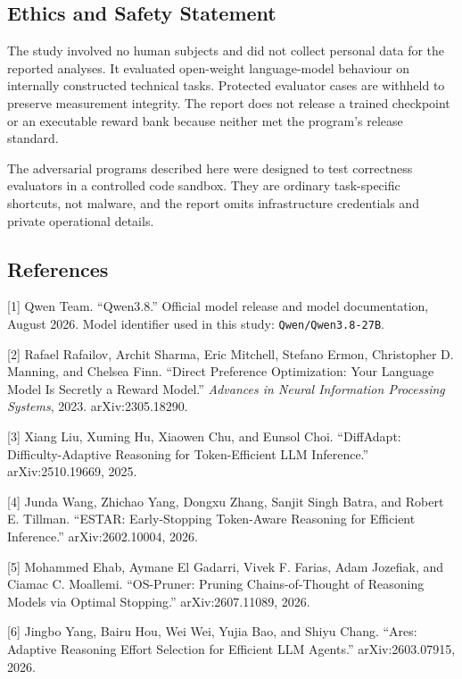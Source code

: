 \documentclass[
]{article}
\begin{document}
\subsection{Ethics and Safety
Statement}\label{ethics-and-safety-statement}

The study involved no human subjects and did not collect personal data
for the reported analyses. It evaluated open-weight language-model
behaviour on internally constructed technical tasks. Protected evaluator
cases are withheld to preserve measurement integrity. The report does
not release a trained checkpoint or an executable reward bank because
neither met the program's release standard.

The adversarial programs described here were designed to test
correctness evaluators in a controlled code sandbox. They are ordinary
task-specific shortcuts, not malware, and the report omits
infrastructure credentials and private operational details.

\subsection{References}\label{references}

{[}1{]} Qwen Team. ``Qwen3.8.'' Official model release and model
documentation, August 2026. Model identifier used in this study:
\texttt{Qwen/Qwen3.8-27B}.

{[}2{]} Rafael Rafailov, Archit Sharma, Eric Mitchell, Stefano Ermon,
Christopher D. Manning, and Chelsea Finn. ``Direct Preference
Optimization: Your Language Model Is Secretly a Reward Model.''
\emph{Advances in Neural Information Processing Systems}, 2023.
arXiv:2305.18290.

{[}3{]} Xiang Liu, Xuming Hu, Xiaowen Chu, and Eunsol Choi. ``DiffAdapt:
Difficulty-Adaptive Reasoning for Token-Efficient LLM Inference.''
arXiv:2510.19669, 2025.

{[}4{]} Junda Wang, Zhichao Yang, Dongxu Zhang, Sanjit Singh Batra, and
Robert E. Tillman. ``ESTAR: Early-Stopping Token-Aware Reasoning for
Efficient Inference.'' arXiv:2602.10004, 2026.

{[}5{]} Mohammed Ehab, Aymane El Gadarri, Vivek F. Farias, Adam
Jozefiak, and Ciamac C. Moallemi. ``OS-Pruner: Pruning Chains-of-Thought
of Reasoning Models via Optimal Stopping.'' arXiv:2607.11089, 2026.

{[}6{]} Jingbo Yang, Bairu Hou, Wei Wei, Yujia Bao, and Shiyu Chang.
``Ares: Adaptive Reasoning Effort Selection for Efficient LLM Agents.''
arXiv:2603.07915, 2026.
\end{document}
